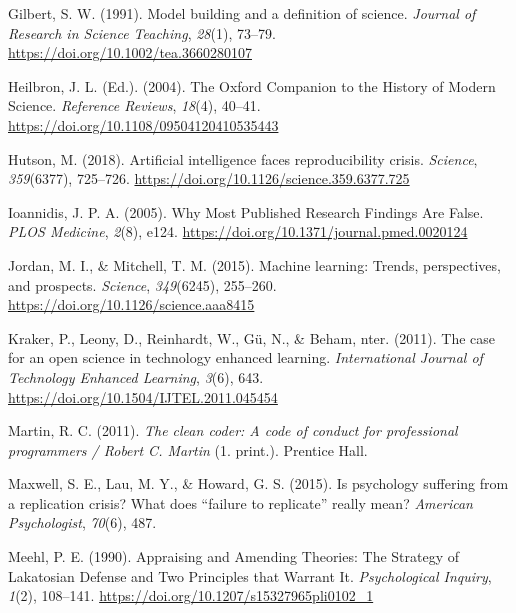 \documentclass[12pt,a4paper,]{article}
\begin{document}
\leavevmode\hypertarget{ref-gilbertModelBuildingDefinition1991}{}%
Gilbert, S. W. (1991). Model building and a definition of science. \emph{Journal of Research in Science Teaching}, \emph{28}(1), 73--79. \url{https://doi.org/10.1002/tea.3660280107}

\leavevmode\hypertarget{ref-heilbronOxfordCompanionHistory2004}{}%
Heilbron, J. L. (Ed.). (2004). The Oxford Companion to the History of Modern Science. \emph{Reference Reviews}, \emph{18}(4), 40--41. \url{https://doi.org/10.1108/09504120410535443}

\leavevmode\hypertarget{ref-hutsonArtificialIntelligenceFaces2018}{}%
Hutson, M. (2018). Artificial intelligence faces reproducibility crisis. \emph{Science}, \emph{359}(6377), 725--726. \url{https://doi.org/10.1126/science.359.6377.725}

\leavevmode\hypertarget{ref-ioannidisWhyMostPublished2005}{}%
Ioannidis, J. P. A. (2005). Why Most Published Research Findings Are False. \emph{PLOS Medicine}, \emph{2}(8), e124. \url{https://doi.org/10.1371/journal.pmed.0020124}

\leavevmode\hypertarget{ref-jordanMachineLearningTrends2015}{}%
Jordan, M. I., \& Mitchell, T. M. (2015). Machine learning: Trends, perspectives, and prospects. \emph{Science}, \emph{349}(6245), 255--260. \url{https://doi.org/10.1126/science.aaa8415}

\leavevmode\hypertarget{ref-krakerCaseOpenScience2011}{}%
Kraker, P., Leony, D., Reinhardt, W., Gü, N., \& Beham, nter. (2011). The case for an open science in technology enhanced learning. \emph{International Journal of Technology Enhanced Learning}, \emph{3}(6), 643. \url{https://doi.org/10.1504/IJTEL.2011.045454}

\leavevmode\hypertarget{ref-martinCleanCoderCode2011}{}%
Martin, R. C. (2011). \emph{The clean coder: A code of conduct for professional programmers / Robert C. Martin} (1. print.). Prentice Hall.

\leavevmode\hypertarget{ref-maxwellPsychologySufferingReplication2015}{}%
Maxwell, S. E., Lau, M. Y., \& Howard, G. S. (2015). Is psychology suffering from a replication crisis? What does ``failure to replicate'' really mean? \emph{American Psychologist}, \emph{70}(6), 487.

\leavevmode\hypertarget{ref-meehlAppraisingAmendingTheories1990}{}%
Meehl, P. E. (1990). Appraising and Amending Theories: The Strategy of Lakatosian Defense and Two Principles that Warrant It. \emph{Psychological Inquiry}, \emph{1}(2), 108--141. \url{https://doi.org/10.1207/s15327965pli0102_1}
\end{document}

